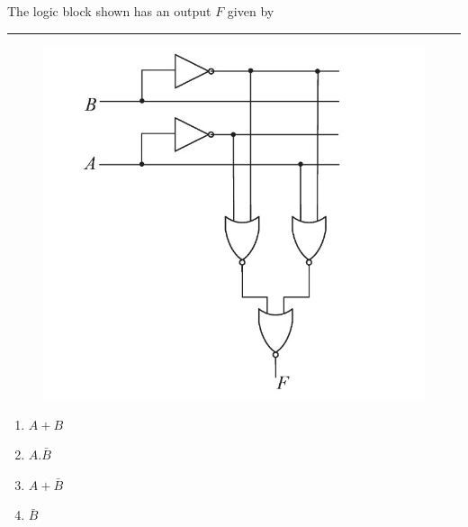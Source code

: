 \documentclass{article}
\begin{document}
The logic block shown has an output $F$ given by \rule{2cm}{0.15mm}
\begin{figure}
\centering
\includegraphics[width=\columnwidth]{Gate figure.jpg}
\end{figure}
\begin{enumerate}
	\item$A+B$
	\item$A.\bar{B}$
	\item$A+\bar{B}$
	\item$\bar{B}$
\end{enumerate}
\end{document}

